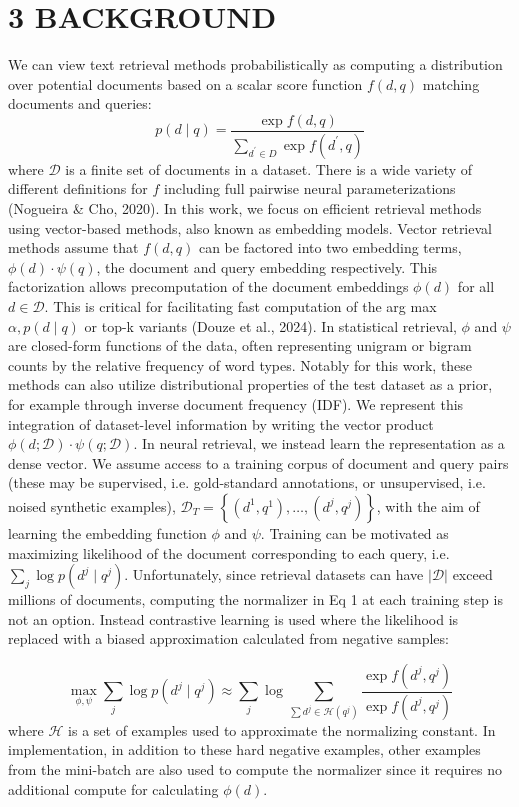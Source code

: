\section*{3 BACKGROUND}
We can view text retrieval methods probabilistically as computing a distribution over potential documents based on a scalar score function \(f(d, q)\) matching documents and queries:
\[
p(d \mid q)=\frac{\exp f(d, q)}{\sum_{d^{\prime} \in D} \exp f\left(d^{\prime}, q\right)}
\]
where \(\mathcal{D}\) is a finite set of documents in a dataset. There is a wide variety of different definitions for \(f\) including full pairwise neural parameterizations (Nogueira \& Cho, 2020). In this work, we focus on efficient retrieval methods using vector-based methods, also known as embedding models.
Vector retrieval methods assume that \(f(d, q)\) can be factored into two embedding terms, \(\phi(d) \cdot \psi(q)\), the document and query embedding respectively. This factorization allows precomputation of the document embeddings \(\phi(d)\) for all \(d \in \mathcal{D}\). This is critical for facilitating fast computation of the arg max \(\alpha, p(d \mid q)\) or top-k variants (Douze et al., 2024).
In statistical retrieval, \(\phi\) and \(\psi\) are closed-form functions of the data, often representing unigram or bigram counts by the relative frequency of word types. Notably for this work, these methods can also utilize distributional properties of the test dataset as a prior, for example through inverse document frequency (IDF). We represent this integration of dataset-level information by writing the vector product \(\phi(d ; \mathcal{D}) \cdot \psi(q ; \mathcal{D})\).
In neural retrieval, we instead learn the representation as a dense vector. We assume access to a training corpus of document and query pairs (these may be supervised, i.e. gold-standard annotations, or unsupervised, i.e. noised synthetic examples), \(\mathcal{D}_{T}=\left\{\left(d^{1}, q^{1}\right), \ldots,\left(d^{j}, q^{j}\right)\right\}\), with the aim of learning the embedding function \(\phi\) and \(\psi\).
Training can be motivated as maximizing likelihood of the document corresponding to each query, i.e. \(\sum_{j} \log p\left(d^{j} \mid q^{j}\right)\). Unfortunately, since retrieval datasets can have \(|\mathcal{D}|\) exceed millions of documents, computing the normalizer in Eq 1 at each training step is not an option. Instead contrastive learning is used where the likelihood is replaced with a biased approximation calculated from negative samples:

\[
\max _{\phi, \psi} \sum_{j} \log p\left(d^{j} \mid q^{j}\right) \approx \sum_{j} \log \sum_{\sum d^{j} \in \mathcal{H}\left(q^{j}\right)} \frac{\exp f\left(d^{j}, q^{j}\right)}{\exp f\left(d^{j}, q^{j}\right)}
\]
where \(\mathcal{H}\) is a set of examples used to approximate the normalizing constant. In implementation, in addition to these hard negative examples, other examples from the mini-batch are also used to compute the normalizer since it requires no additional compute for calculating \(\phi(d)\).
